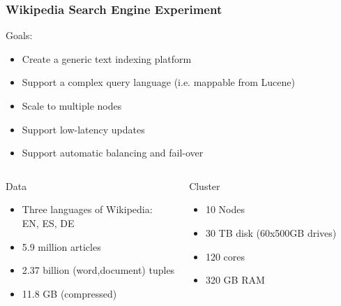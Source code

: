 \documentclass[t,landscape]{beamer}
\begin{document}
\begin{frame}
\frametitle{Wikipedia Search Engine Experiment}
\scriptsize
Goals:
\begin{itemize}
\item{Create a generic text indexing platform}
\item{Support a complex query language (i.e. mappable from Lucene)}
\item{Scale to multiple nodes}
\item{Support low-latency updates}
\item{Support automatic balancing and fail-over}
\end{itemize}
\begin{columns}
\begin{block}{Data}
\begin{itemize}
\item{Three languages of Wikipedia:\\EN, ES, DE}
\item{5.9 million articles}
\item{2.37 billion (word,document) tuples}
\item{11.8 GB (compressed)}
\end{itemize}
\end{block}
\begin{block}{Cluster}
\begin{itemize}
\item{10 Nodes}
\item{30 TB disk (60x500GB drives)}
\item{120 cores}
\item{320 GB RAM}
\end{itemize}
\end{block}
\end{columns}
\end{frame}
\end{document}
